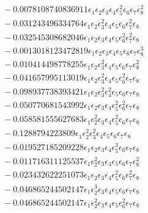 \documentclass[10pt]{article}
\begin{document}
\begin{align*}
&{}  - 0.0078108740836911 \epsilon_{1} \epsilon_{2} \epsilon_{3} \epsilon_{4} \epsilon_{5}^{2} \epsilon_{6} \epsilon_{7} \epsilon_{8}^{2} \\
&{}  - 0.031243496334764 \epsilon_{1} \epsilon_{2} \epsilon_{3}^{2} \epsilon_{4} \epsilon_{5} \epsilon_{6} \epsilon_{7}^{2} \epsilon_{8} \\
&{}  - 0.032545308682046 \epsilon_{1} \epsilon_{2} \epsilon_{3} \epsilon_{4} \epsilon_{5} \epsilon_{6}^{2} \epsilon_{7}^{2} \epsilon_{8} \\
&{}  - 0.0013018123472819 \epsilon_{1} \epsilon_{2} \epsilon_{3} \epsilon_{4} \epsilon_{5} \epsilon_{6} \epsilon_{7} \epsilon_{8}^{3} \\
&{}  - 0.010414498778255 \epsilon_{1} \epsilon_{2} \epsilon_{3}^{2} \epsilon_{4} \epsilon_{5} \epsilon_{6} \epsilon_{7} \epsilon_{8}^{2} \\
&{}  - 0.041657995113019 \epsilon_{1} \epsilon_{2} \epsilon_{3}^{2} \epsilon_{4} \epsilon_{5} \epsilon_{6}^{2} \epsilon_{7} \epsilon_{8} \\
&{}  - 0.098937738393421 \epsilon_{1} \epsilon_{2} \epsilon_{3}^{2} \epsilon_{4}^{2} \epsilon_{5} \epsilon_{6} \epsilon_{7} \epsilon_{8} \\
&{}  - 0.050770681543992 \epsilon_{1} \epsilon_{2} \epsilon_{3} \epsilon_{4} \epsilon_{5}^{2} \epsilon_{6}^{2} \epsilon_{7} \epsilon_{8} \\
&{}  - 0.058581555627683 \epsilon_{1} \epsilon_{2}^{2} \epsilon_{3} \epsilon_{4} \epsilon_{5}^{2} \epsilon_{6} \epsilon_{7} \epsilon_{8} \\
&{}  - 0.1288794223809 \epsilon_{1} \epsilon_{2}^{2} \epsilon_{3}^{2} \epsilon_{4} \epsilon_{5} \epsilon_{6} \epsilon_{7} \epsilon_{8} \\
&{}  - 0.019527185209228 \epsilon_{1} \epsilon_{2} \epsilon_{3} \epsilon_{4} \epsilon_{5}^{3} \epsilon_{6} \epsilon_{7} \epsilon_{8} \\
&{}  - 0.011716311125537 \epsilon_{1} \epsilon_{2}^{2} \epsilon_{3} \epsilon_{4} \epsilon_{5} \epsilon_{6} \epsilon_{7} \epsilon_{8}^{2} \\
&{}  - 0.023432622251073 \epsilon_{1} \epsilon_{2} \epsilon_{3} \epsilon_{4} \epsilon_{5}^{2} \epsilon_{6} \epsilon_{7}^{2} \epsilon_{8} \\
&{}  - 0.046865244502147 \epsilon_{1} \epsilon_{2}^{3} \epsilon_{3} \epsilon_{4} \epsilon_{5} \epsilon_{6} \epsilon_{7} \epsilon_{8} \\
&{}  - 0.046865244502147 \epsilon_{1} \epsilon_{2}^{2} \epsilon_{3} \epsilon_{4} \epsilon_{5} \epsilon_{6}^{2} \epsilon_{7} \epsilon_{8} \\

\end{align*}
\end{document}
